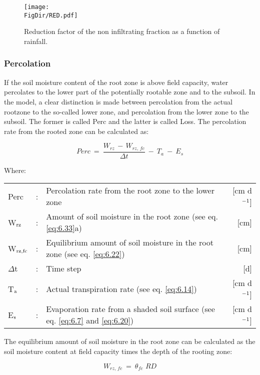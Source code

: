 \begin{figure}[p]
	\centering
	\texttt{[image: \\FigDir/RED.pdf]}
	\caption{Reduction factor of the non infiltrating fraction as a function of rainfall.}
	\label{fig:NonInfiltFrac}
\end{figure}

\subsubsection{Percolation}
If the soil moisture content of the root zone is above field capacity, water percolates to
the lower part of the potentially rootable zone and to the subsoil. In the model, a clear
distinction is made between percolation from the actual rootzone to the so-called lower
zone, and percolation from the lower zone to the subsoil. The former is called Perc and
the latter is called Loss. The percolation rate from the rooted zone can be calculated as:

\begin{equation}
\label{eq:6.21}
Perc  ~=~{\frac{W _{rz} \, -\, W _{rz,\, fc} }{\Delta t}} ~-~ T _{a} ~-~ E _{s} 
\end{equation}

Where:\\[5pt]
\begin{tabularx}{\textwidth}{llXr}
	Perc &:& Percolation rate from the root zone to the lower zone  & [cm d$^{{\rm -1}}$]\\
	W$_{{\rm rz}}$ &:& Amount of soil moisture in the root zone (see eq. \ref{eq:6.33}a)  & [cm]\\
	W$_{{\rm rz,fc}}$ &:& Equilibrium amount of soil moisture in the root
	zone (see eq. \ref{eq:6.22})  & [cm]\\
	$\Delta$t &:& Time step  & [d]\\
	T$_{{\rm a}}$ &:& Actual transpiration rate (see eq. \ref{eq:6.14})  & [cm d$^{{\rm -1}}$]\\
	E$_{{\rm s}}$ &:& Evaporation rate from a shaded soil surface 
	(see eq. \ref{eq:6.7}  and \ref{eq:6.20})  & [cm d$^{{\rm -1}}$]\\
\end{tabularx}

The equilibrium amount of soil moisture in the root zone can be calculated as the soil
moisture content at field capacity times the depth of the rooting zone:

\begin{equation}
\label{eq:6.22}
W _{rz,\, fc} ~=~ \theta  _{fc} \,\, RD
\end{equation}

